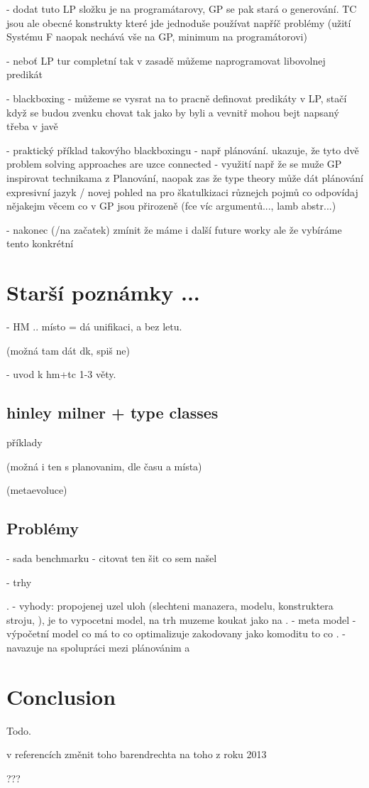 \documentclass[11pt]{article}
\newcommand{\red}[1]{{\color{red} #1}}
\begin{document}
\begin{article}
\red{
- dodat tuto LP složku je na programátarovy, GP se pak stará o generování. 
  TC jsou ale obecné konstrukty které jde jednoduše používat napříč problémy
  (užití Systému F naopak nechává vše na GP, minimum na programátorovi) 

- neboť LP tur completní tak v zasadě můžeme naprogramovat libovolnej predikát

- blackboxing - můžeme se vysrat na to pracně definovat predikáty v LP, stačí když se budou zvenku chovat tak jako by byli a vevnitř mohou bejt napsaný třeba v javě

- praktický příklad takovýho blackboxingu - např plánování. ukazuje, že tyto dvě problem solving approaches are uzce connected - využití např že se muže GP inspirovat technikama z Planování, naopak zas že type theory může dát plánování expresivní jazyk / novej pohled na pro škatulkizaci různejch pojmů co odpovídaj nějakejm věcem co v GP jsou přirozeně (fce víc argumentů..., lamb abstr...)

- nakonec (/na začatek) zmínit že máme i další future worky ale že vybíráme tento konkrétní
}

\section{Starší poznámky ...}

- HM .. místo = dá unifikaci, a bez letu.

(možná tam dát dk, spiš ne)

- uvod k hm+tc 1-3 věty.

\subsection{hinley milner + type classes}

příklady

(možná i ten s planovanim, dle času a místa)

(metaevoluce)

\subsection{Problémy}

- sada benchmarku - citovat ten šit co sem našel

- trhy

. - vyhody: propojenej uzel uloh (slechteni manazera, modelu, konstruktera stroju, ), je to vypocetni model, na trh muzeme koukat jako na 
. - meta model - výpočetní model co má to co optimalizuje zakodovany jako komoditu to co 
. - navazuje na spolupráci mezi plánovánim a 

\section{Conclusion}
Todo.


\red{v referencích změnit toho barendrechta na toho z roku 2013}

\acknowledgments %
{???}



\end{article}
\end{document}
